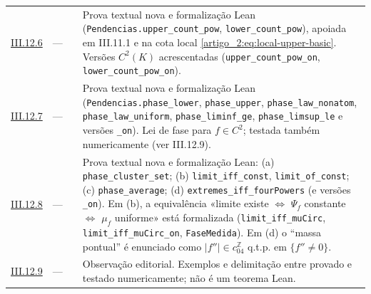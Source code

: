 \documentclass[12pt,a4paper]{article}
\theoremstyle{preciso}
\theoremstyle{definition}
\theoremstyle{preciso}
\theoremstyle{preciso}
\theoremstyle{preciso}
\theoremstyle{preciso}
\theoremstyle{definition}
\theoremstyle{preciso}
\theoremstyle{definition}
\theoremstyle{preciso}
\theoremstyle{preciso}
\theoremstyle{definition}
\begin{document}
\begin{singlespace}
\begin{longtable}{@{}p{.11\linewidth}p{.09\linewidth}p{.09\linewidth}p{.59\linewidth}@{}}
\hyperref[map:artigo_2:12.6]{III.12.6} & --- & \pageref{map:artigo_2:12.6} & Prova textual nova e formalização Lean (\texttt{Pendencias.upper\_count\_pow}, \texttt{lower\_count\_pow}), apoiada em III.11.1 e na cota local \eqref{artigo_2:eq:local-upper-basic}. Versões $C^2(K)$ acrescentadas (\texttt{upper\_count\_pow\_on}, \texttt{lower\_count\_pow\_on}).\\[4pt]
\hyperref[map:artigo_2:12.7]{III.12.7} & --- & \pageref{map:artigo_2:12.7} & Prova textual nova e formalização Lean (\texttt{Pendencias.phase\_lower}, \texttt{phase\_upper}, \texttt{phase\_law\_nonatom}, \texttt{phase\_law\_uniform}, \texttt{phase\_liminf\_ge}, \texttt{phase\_limsup\_le} e versões \texttt{\_on}). Lei de fase para $f\in C^2$; testada também numericamente (ver III.12.9).\\[4pt]
\hyperref[map:artigo_2:12.8]{III.12.8} & --- & \pageref{map:artigo_2:12.8} & Prova textual nova e formalização Lean: (a) \texttt{phase\_cluster\_set}; (b) \texttt{limit\_iff\_const}, \texttt{limit\_of\_const}; (c) \texttt{phase\_average}; (d) \texttt{extremes\_iff\_fourPowers} (e versões \texttt{\_on}). Em (b), a equivalência «limite existe $\Leftrightarrow$ $\Psi_f$ constante $\Leftrightarrow$ $\mu_f$ uniforme» está formalizada (\texttt{limit\_iff\_muCirc}, \texttt{limit\_iff\_muCirc\_on}, \texttt{FaseMedida}). Em (d) o ``massa pontual'' é enunciado como $|f''|\in c_04^{\mathbb Z}$ q.t.p. em $\{f''\ne0\}$.\\[4pt]
\hyperref[map:artigo_2:12.9]{III.12.9} & --- & \pageref{map:artigo_2:12.9} & Observação editorial. Exemplos e delimitação entre provado e testado numericamente; não é um teorema Lean.\\[4pt]
\bottomrule\end{longtable}\normalsize


\end{singlespace}
\end{document}
